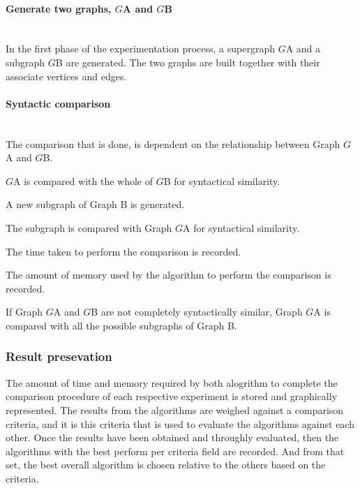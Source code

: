 \paragraph{Generate two graphs, $G${\tiny A} and $G${\tiny B}}\mbox{}\\
In the first phase of the experimentation process, a supergraph $G${\tiny A} and a subgraph $G${\tiny B} are generated. The two graphs are built together 
with their associate vertices and edges.
\paragraph{Syntactic comparison}\mbox{}\\
The comparison that is done, is dependent on the relationship between Graph $G${\tiny A} and $G${\tiny B}.
\begin{myEnumerate}
\item $G${\tiny A} is compared with the whole of $G${\tiny B} for syntactical similarity.										
\begin{myEnumerate}
\item A new subgraph of Graph B is generated.
\item The subgraph is compared with Graph $G${\tiny A} for syntactical similarity.											
\begin{myEnumerate}
\item The time taken to perform the comparison is recorded.
\item The amount of memory used by the algorithm to perform the comparison is recorded.
\end{myEnumerate}
\end{myEnumerate}
\item If Graph $G${\tiny A} and $G${\tiny B} are not completely syntactically similar, Graph $G${\tiny A} is compared with all the possible subgraphs of Graph B.
\end{myEnumerate}

\subsubsection{Result presevation}
The amount of time and memory required by both alogrithm to complete the comparison procedure of each respective experiment is stored and graphically represented. 
The results from the algorithms are weighed against a comparison criteria, and it is this criteria that is used to evaluate the algorithms against each other.\newline\newline
Once the results have been obtained and throughly evaluated, then the algorithms with the best perform per criteria field are recorded.\newline\newline
And from that set, the best overall  algorithm is chosen relative to the others based on the criteria.\newpage
